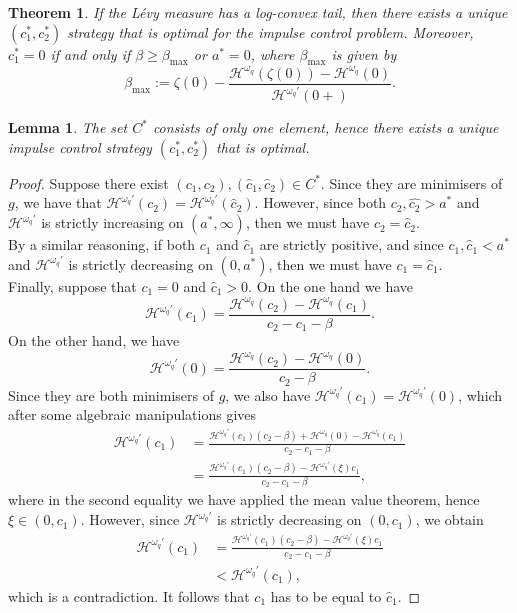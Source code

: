 \documentclass[10pt,a4paper]{amsart}
\newtheorem{theorem}{Theorem}[section]
\newtheorem{lemma}{Lemma}[section]
\newcommand{\cH}{\mathcal{H}}
\newcommand{\homega}{\omega_q}
\renewcommand{\geq}{\geqslant}
\begin{document}
\begin{theorem}\label{thm.unique}
	If the L\'evy measure has a log-convex tail, then there exists a unique $(c^\ast_1,c^\ast_2)$ strategy that is optimal for the impulse control problem. Moreover, $c_1^\ast = 0$ if and only if $\beta \geq \beta_{\max}$ or $a^\ast = 0$, where $\beta_{\max}$ is given by 
	\begin{equation}\label{eq:betamax}
		\beta_{\max}:= \zeta(0) - \frac{\cH^{\homega}(\zeta(0)) - \cH^{\homega}(0)}{\cH^{\homega\prime}(0+)}.
	\end{equation}
\end{theorem}

\begin{lemma}\label{lemma.unique} The set $C^\ast$ consists of only one element, hence there exists a unique impulse control strategy $(c_1^\ast,c_2^\ast)$ that is optimal.
\end{lemma}
\begin{proof}
	Suppose there exist $(c_1,c_2), (\hat{c}_1,\hat{c}_2) \in C^\ast$. Since they are minimisers of $g$, we have that $\cH^{\homega\prime}(c_2)= \cH^{\homega\prime}(\hat{c}_2)$. However, since both $c_2,\hat{c_2} > a^\ast$ and $\cH^{\homega\prime}$ is strictly increasing on $(a^\ast,\infty)$, then we must have $c_2 = \hat{c}_2$.\\
	By a similar reasoning, if both $c_1$ and $\hat{c}_1$ are strictly positive, and since $c_1,\hat{c}_1 < a^\ast$ and $\cH^{\homega\prime}$ is strictly decreasing on $(0,a^\ast)$, then we must have $c_1 = \hat{c}_1$.\\
	Finally, suppose that $c_1 = 0$ and $\hat{c}_1 > 0$. On the one hand we have
	\[
	\cH^{\homega\prime}(c_1) = \frac{\cH^{\homega}(c_2)-\cH^{\homega}(c_1)}{c_2-c_1-\beta}.
	\]
	On the other hand, we have
	\[
	\cH^{\homega\prime}(0) = \frac{\cH^{\homega}(c_2)-\cH^{\homega}(0)}{c_2-\beta}.
	\]
	Since they are both minimisers of $g$, we also have $ \cH^{\homega\prime}(c_1) = \cH^{\homega\prime}(0) $, which after some algebraic manipulations gives
	\begin{align*}
	\cH^{\homega\prime}(c_1) &= \frac{\cH^{\homega\prime}(c_1)(c_2-\beta) + \cH^{\homega}(0) - \cH^{\homega}(c_1)}{c_2-c_1-\beta}\\
	&= \frac{\cH^{\homega\prime}(c_1)(c_2-\beta) - \cH^{\homega\prime}(\xi)c_1}{c_2-c_1-\beta},
	\end{align*}
	where in the second equality we have applied the mean value theorem, hence $\xi \in (0,c_1)$. However, since $\cH^{\homega\prime}$ is strictly decreasing on $(0,c_1)$, we obtain
	\begin{align*}
	\cH^{\homega\prime}(c_1) &= \frac{\cH^{\homega\prime}(c_1)(c_2-\beta) - \cH^{\homega\prime}(\xi)c_1}{c_2-c_1-\beta}\\
	&< \cH^{\homega\prime}(c_1),
	\end{align*}
	which is a contradiction. It follows that $c_1$ has to be equal to $\hat{c}_1$.
\end{proof}
\end{document}
